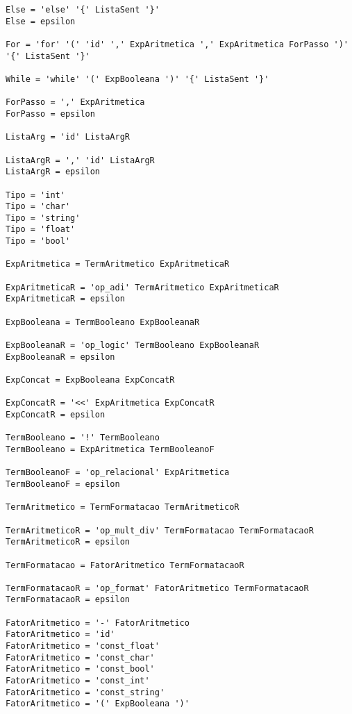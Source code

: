 \documentclass[
  12pt,				%
  oneside,			%
  a4paper,			%
  english,			%
  french,				%
  spanish,			%
  brazil,				%
]{abntex2}
\begin{document}
\begin{lstlisting}[label={code:gramatica-original},caption={Gramática
    original da linguagem de programação LisC.},style={mystyle}]
Else = 'else' '{' ListaSent '}'
Else = epsilon

For = 'for' '(' 'id' ',' ExpAritmetica ',' ExpAritmetica ForPasso ')' '{' ListaSent '}'

While = 'while' '(' ExpBooleana ')' '{' ListaSent '}'

ForPasso = ',' ExpAritmetica
ForPasso = epsilon

ListaArg = 'id' ListaArgR

ListaArgR = ',' 'id' ListaArgR
ListaArgR = epsilon

Tipo = 'int'
Tipo = 'char'
Tipo = 'string'
Tipo = 'float'
Tipo = 'bool'

ExpAritmetica = TermAritmetico ExpAritmeticaR

ExpAritmeticaR = 'op_adi' TermAritmetico ExpAritmeticaR
ExpAritmeticaR = epsilon

ExpBooleana = TermBooleano ExpBooleanaR

ExpBooleanaR = 'op_logic' TermBooleano ExpBooleanaR
ExpBooleanaR = epsilon

ExpConcat = ExpBooleana ExpConcatR

ExpConcatR = '<<' ExpAritmetica ExpConcatR
ExpConcatR = epsilon

TermBooleano = '!' TermBooleano
TermBooleano = ExpAritmetica TermBooleanoF

TermBooleanoF = 'op_relacional' ExpAritmetica
TermBooleanoF = epsilon

TermAritmetico = TermFormatacao TermAritmeticoR

TermAritmeticoR = 'op_mult_div' TermFormatacao TermFormatacaoR
TermAritmeticoR = epsilon

TermFormatacao = FatorAritmetico TermFormatacaoR

TermFormatacaoR = 'op_format' FatorAritmetico TermFormatacaoR
TermFormatacaoR = epsilon

FatorAritmetico = '-' FatorAritmetico
FatorAritmetico = 'id'
FatorAritmetico = 'const_float'
FatorAritmetico = 'const_char'
FatorAritmetico = 'const_bool'
FatorAritmetico = 'const_int'
FatorAritmetico = 'const_string'
FatorAritmetico = '(' ExpBooleana ')'

\end{lstlisting}




\postextual


\printindex
\end{document}
